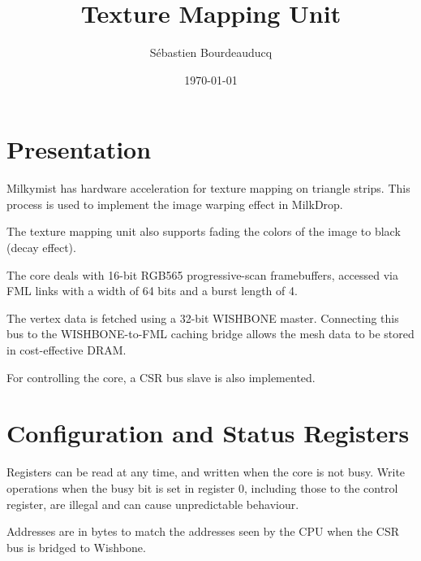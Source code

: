 \documentclass[a4paper,11pt]{article}
\title{Texture Mapping Unit}
\author{S\'ebastien Bourdeauducq}
\date{\today}
\begin{document}
\setlength{\parindent}{0pt}
\setlength{\parskip}{5pt}
\maketitle{}

\section{Presentation}
Milkymist has hardware acceleration for texture mapping on triangle strips. This process is used to implement the image warping effect in MilkDrop.

The texture mapping unit also supports fading the colors of the image to black (decay effect).

The core deals with 16-bit RGB565 progressive-scan framebuffers, accessed via FML links with a width of 64 bits and a burst length of 4.

The vertex data is fetched using a 32-bit WISHBONE master. Connecting this bus to the WISHBONE-to-FML caching bridge allows the mesh data to be stored in cost-effective DRAM.

For controlling the core, a CSR bus slave is also implemented.

\section{Configuration and Status Registers}
Registers can be read at any time, and written when the core is not busy. Write operations when the busy bit is set in register 0, including those to the control register, are illegal and can cause unpredictable behaviour.

Addresses are in bytes to match the addresses seen by the CPU when the CSR bus is bridged to Wishbone.
\end{document}

